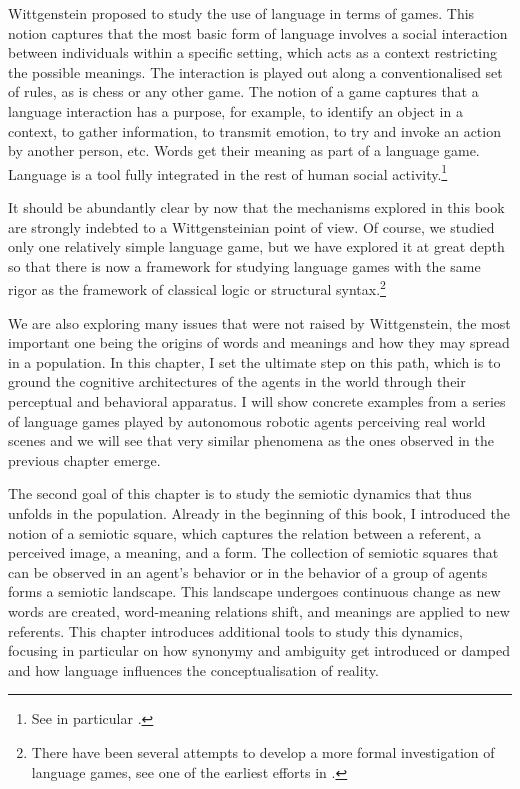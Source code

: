 Wittgenstein proposed to study the use of language in terms of 
games. This notion captures that the most basic form of
language involves a social interaction between individuals
within a specific setting, which acts as a context restricting
the possible meanings. The interaction is played out 
along a conventionalised set of rules, as is chess or any
other game. The notion of a game captures
that a language interaction has a purpose, for example,
to identify an object in a context, to gather 
information, to transmit emotion, to try and
invoke an action by another person, etc. Words get \enlargethispage{2\baselineskip}
their meaning as part of a language game. Language is a tool 
fully integrated in the rest of human social activity.\footnote{See in particular \cite{Wittgenstein:1953}.}

It should be abundantly clear by now that the mechanisms explored
in this book are strongly indebted to a Wittgensteinian 
point of view. Of course, we studied only one relatively 
simple language game, but we have explored it at
great depth so that there is now a framework for
studying language games with the same rigor as 
the framework of classical logic or structural syntax.\footnote{There have been several attempts to develop a 
more formal investigation of language games, see one of the 
earliest efforts in \cite{Hintikka:1998}.}

We are also exploring many issues that were not raised
by Wittgenstein, the most important one being the origins 
of words and meanings and how they may spread in 
a population. In this chapter, I set the ultimate 
step on this path, which is 
to ground the cognitive architectures of the agents
in the world through their perceptual and behavioral
apparatus. I will show concrete examples from a
series of language games played by autonomous 
robotic agents perceiving real world scenes
and we will see that very similar
phenomena as the ones observed in the previous chapter
emerge. 

The second goal of this chapter is to study the semiotic
dynamics that thus unfolds in the population. 
Already in the beginning of this book, I introduced the 
notion of a semiotic square, which captures the relation
between a referent, a perceived image, 
a meaning, and a form. The collection 
of semiotic squares that can be observed in an agent's
behavior or in the behavior of a group of agents
forms a semiotic landscape. This landscape undergoes
continuous change as new words are created, word-meaning relations
shift, and meanings are applied to new referents. 
This chapter introduces additional tools to study this dynamics, 
focusing in particular on how synonymy and ambiguity get
introduced or damped and how language influences the 
conceptualisation of reality. 

